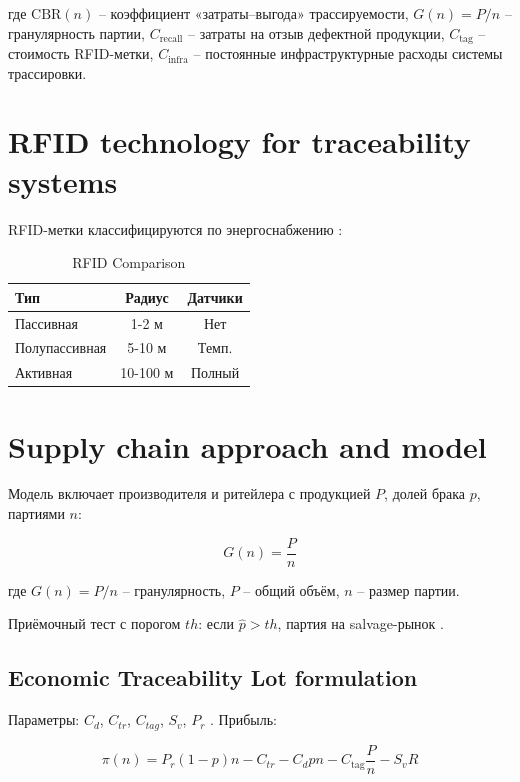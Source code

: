 \documentclass[fleqn,10pt,russian]{olplainarticle-class}
\begin{document}
где $\text{CBR}(n)$ -- коэффициент «затраты–выгода» трассируемости, 
$G(n)=P/n$ -- гранулярность партии, 
$C_{\text{recall}}$ -- затраты на отзыв дефектной продукции, 
$C_{\text{tag}}$ -- стоимость RFID-метки, 
$C_{\text{infra}}$ -- постоянные инфраструктурные расходы системы трассировки.

\section*{RFID technology for traceability systems}

RFID-метки классифицируются по энергоснабжению \cite{BartkovaJouvet1999}:

\begin{table}[h]
\centering
\caption{RFID Comparison}
\begin{tabular}{|l|c|c|}
\hline
Тип & Радиус & Датчики \\
\hline
Пассивная & 1-2 м & Нет \\
Полупассивная & 5-10 м & Темп. \\
Активная & 10-100 м & Полный \\
\hline
\end{tabular}
\label{tab:rfid}
\end{table}

\section*{Supply chain approach and model}

Модель включает производителя и ритейлера с продукцией $P$, долей брака $p$, партиями $n$:

\begin{equation}
G(n)=\frac{P}{n}
\label{eq:granularity}
\end{equation}

где $G(n)=P/n$ -- гранулярность, $P$ -- общий объём, $n$ -- размер партии.

Приёмочный тест с порогом $th$: если $\hat{p}>th$, партия на salvage-рынок \cite{Indura2010}.

\subsection*{Economic Traceability Lot formulation}

Параметры: $C_d$, $C_{tr}$, $C_{tag}$, $S_v$, $P_r$ \cite{NACA460}. Прибыль:

\begin{equation}
\pi(n)=P_r(1-p)n-C_{tr}-C_d pn-C_{\text{tag}}\frac{P}{n}-S_v R
\label{eq:profit}
\end{equation}
\end{document}
